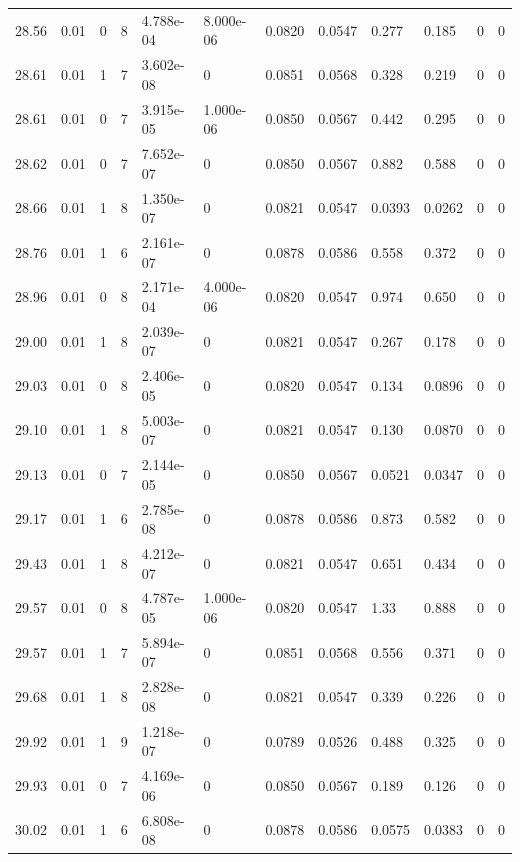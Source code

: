 \documentclass[preview]{standalone}
\begin{document}
{{{{{{{{\begin{tabular}{L{1.2cm}C{1.2cm} C{0.3cm}C{0.5cm} C{1.4cm}C{1.4cm} C{1.4cm}C{1.4cm} C{1.6cm}C{1.6cm} C{1.6cm}C{1.6cm}}
  28.56  &  0.01  & 0     &  8 &  4.788e-04  & 8.000e-06  &  0.0820&   0.0547& 0.277 & 0.185   &  0 & 0  \\ 
  28.61  &  0.01  & 1     &  7 &  3.602e-08  & 0  &  0.0851&   0.0568& 0.328 & 0.219   &  0 & 0  \\ 
  28.61  &  0.01  & 0     &  7 &  3.915e-05  & 1.000e-06  &  0.0850&   0.0567& 0.442 & 0.295   &  0 & 0  \\ 
  28.62  &  0.01  & 0     &  7 &  7.652e-07  & 0  &  0.0850&   0.0567& 0.882 & 0.588   &  0 & 0  \\ 
  28.66  &  0.01  & 1     &  8 &  1.350e-07  & 0  &  0.0821&   0.0547& 0.0393 & 0.0262   &  0 & 0  \\ 
  28.76  &  0.01  & 1     &  6 &  2.161e-07  & 0  &  0.0878&   0.0586& 0.558 & 0.372   &  0 & 0  \\ 
  28.96  &  0.01  & 0     &  8 &  2.171e-04  & 4.000e-06  &  0.0820&   0.0547& 0.974 & 0.650   &  0 & 0  \\ 
  29.00  &  0.01  & 1     &  8 &  2.039e-07  & 0  &  0.0821&   0.0547& 0.267 & 0.178   &  0 & 0  \\ 
  29.03  &  0.01  & 0     &  8 &  2.406e-05  & 0  &  0.0820&   0.0547& 0.134 & 0.0896   &  0 & 0  \\ 
  29.10  &  0.01  & 1     &  8 &  5.003e-07  & 0  &  0.0821&   0.0547& 0.130 & 0.0870   &  0 & 0  \\ 
  29.13  &  0.01  & 0     &  7 &  2.144e-05  & 0  &  0.0850&   0.0567& 0.0521 & 0.0347   &  0 & 0  \\ 
  29.17  &  0.01  & 1     &  6 &  2.785e-08  & 0  &  0.0878&   0.0586& 0.873 & 0.582   &  0 & 0  \\ 
  29.43  &  0.01  & 1     &  8 &  4.212e-07  & 0  &  0.0821&   0.0547& 0.651 & 0.434   &  0 & 0  \\ 
  29.57  &  0.01  & 0     &  8 &  4.787e-05  & 1.000e-06  &  0.0820&   0.0547& 1.33 & 0.888   &  0 & 0  \\ 
  29.57  &  0.01  & 1     &  7 &  5.894e-07  & 0  &  0.0851&   0.0568& 0.556 & 0.371   &  0 & 0  \\ 
  29.68  &  0.01  & 1     &  8 &  2.828e-08  & 0  &  0.0821&   0.0547& 0.339 & 0.226   &  0 & 0  \\ 
  29.92  &  0.01  & 1     &  9 &  1.218e-07  & 0  &  0.0789&   0.0526& 0.488 & 0.325   &  0 & 0  \\ 
  29.93  &  0.01  & 0     &  7 &  4.169e-06  & 0  &  0.0850&   0.0567& 0.189 & 0.126   &  0 & 0  \\ 
  30.02  &  0.01  & 1     &  6 &  6.808e-08  & 0  &  0.0878&   0.0586& 0.0575 & 0.0383   &  0 & 0  \\ 

\end{tabular}}}}}}}}}
\end{document}

